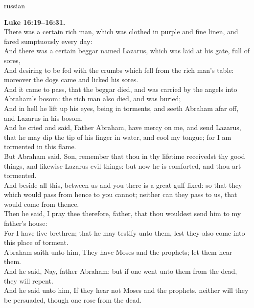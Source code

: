 \documentclass[10pt]{article} %
\begin{document}
{\begin{minipage}[t]{0.45\textwidth}
\begin{otherlanguage*}{russian}
\end{otherlanguage*}
\end{minipage}
\hfill
\begin{minipage}[t]{0.45\textwidth}

\textbf{Luke 16:19--16:31.}\\
There was a certain rich man, which was clothed in purple and fine linen, and fared sumptuously every day:\\
And there was a certain beggar named Lazarus, which was laid at his gate, full of sores,\\
And desiring to be fed with the crumbs which fell from the rich man's table: moreover the dogs came and licked his sores.\\
And it came to pass, that the beggar died, and was carried by the angels into Abraham's bosom: the rich man also died, and was buried;\\
And in hell he lift up his eyes, being in torments, and seeth Abraham afar off, and Lazarus in his bosom.\\
And he cried and said, Father Abraham, have mercy on me, and send Lazarus, that he may dip the tip of his finger in water, and cool my tongue; for I am tormented in this flame.\\
But Abraham said, Son, remember that thou in thy lifetime receivedst thy good things, and likewise Lazarus evil things: but now he is comforted, and thou art tormented.\\
And beside all this, between us and you there is a great gulf fixed: so that they which would pass from hence to you cannot; neither can they pass to us, that would come from thence.\\
Then he said, I pray thee therefore, father, that thou wouldest send him to my father's house:\\
For I have five brethren; that he may testify unto them, lest they also come into this place of torment.\\
Abraham saith unto him, They have Moses and the prophets; let them hear them.\\
And he said, Nay, father Abraham: but if one went unto them from the dead, they will repent.\\
And he said unto him, If they hear not Moses and the prophets, neither will they be persuaded, though one rose from the dead.\\

\end{minipage}}
\vspace*{\fill}
\newpage
\end{document}
